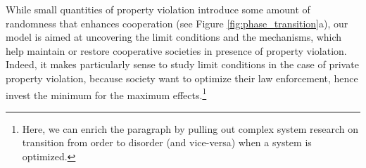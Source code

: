 While small quantities of property violation introduce some amount of randomness that enhances cooperation (see Figure \ref{fig:phase_transition}a), our model is aimed at uncovering the limit conditions and the mechanisms, which help maintain or restore cooperative societies in presence of property violation. Indeed, it makes particularly sense to study limit conditions in the case of private property violation, because society want to optimize their law enforcement, hence invest the minimum for the maximum effects.\footnote{Here, we can enrich the paragraph by pulling out complex system research on transition from order to disorder (and vice-versa) when a system is optimized.}



